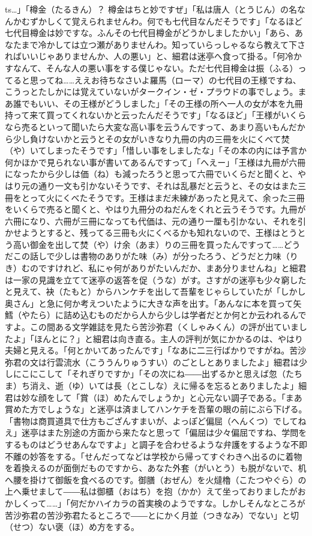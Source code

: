 \documentclass{book}
\begin{document}
ts{}\ldots{}」「樽金（たるきん）？ 樽金はちと妙ですぜ」「私は唐人（とうじん）の名なんかむずかしくて覚えられませんわ。何でも七代目なんだそうです」「なるほど七代目樽金は妙ですな。ふんその七代目樽金がどうかしましたかい」「あら、あなたまで冷かしては立つ瀬がありませんわ。知っていらっしゃるなら教えて下さればいいじゃありませんか、人の悪い」と、細君は迷亭へ食って掛る。「何冷かすなんて、そんな人の悪い事をする僕じゃない。ただ七代目樽金は振（ふる）ってると思ってね\ldots{}\ldots{}ええお待ちなさいよ羅馬（ローマ）の七代目の王様ですね、こうっとたしかには覚えていないがタークイン・ゼ・プラウドの事でしょう。まあ誰でもいい、その王様がどうしました」「その王様の所へ一人の女が本を九冊持って来て買ってくれないかと云ったんだそうです」「なるほど」「王様がいくらなら売るといって聞いたら大変な高い事を云うんですって、あまり高いもんだから少し負けないかと云うとその女がいきなり九冊の内の三冊を火にくべて焚（や）いてしまったそうです」「惜しい事をしましたな」「その本の内には予言か何かほかで見られない事が書いてあるんですって」「へえー」「王様は九冊が六冊になったから少しは価（ね）も減ったろうと思って六冊でいくらだと聞くと、やはり元の通り一文も引かないそうです、それは乱暴だと云うと、その女はまた三冊をとって火にくべたそうです。王様はまだ未練があったと見えて、余った三冊をいくらで売ると聞くと、やはり九冊分のねだんをくれと云うそうです。九冊が六冊になり、六冊が三冊になっても代価は、元の通り一厘も引かない、それを引かせようとすると、残ってる三冊も火にくべるかも知れないので、王様はとうとう高い御金を出して焚（や）け余（あま）りの三冊を買ったんですって\ldots{}\ldots{}どうだこの話しで少しは書物のありがた味（み）が分ったろう、どうだと力味（りき）むのですけれど、私にゃ何がありがたいんだか、まあ分りませんね」と細君は一家の見識を立てて迷亭の返答を促（うな）がす。さすがの迷亭も少々窮したと見えて、袂（たもと）からハンケチを出して吾輩をじゃらしていたが「しかし奥さん」と急に何か考えついたように大きな声を出す。「あんなに本を買って矢鱈（やたら）に詰め込むものだから人から少しは学者だとか何とか云われるんですよ。この間ある文学雑誌を見たら苦沙弥君（くしゃみくん）の評が出ていましたよ」「ほんとに？」と細君は向き直る。主人の評判が気にかかるのは、やはり夫婦と見える。「何とかいてあったんです」「なあに二三行ばかりですがね。苦沙弥君の文は行雲流水（こううんりゅうすい）のごとしとありましたよ」細君は少しにこにこして「それぎりですか」「その次にね――出ずるかと思えば忽（たちま）ち消え、逝（ゆ）いては長（とこしな）えに帰るを忘るとありましたよ」細君は妙な顔をして「賞（ほ）めたんでしょうか」と心元ない調子である。「まあ賞めた方でしょうな」と迷亭は済ましてハンケチを吾輩の眼の前にぶら下げる。「書物は商買道具で仕方もござんすまいが、よっぽど偏屈（へんくつ）でしてねえ」迷亭はまた別途の方面から来たなと思って「偏屈は少々偏屈ですね、学問をするものはどうせあんなですよ」と調子を合わせるような弁護をするような不即不離の妙答をする。「せんだってなどは学校から帰ってすぐわきへ出るのに着物を着換えるのが面倒だものですから、あなた外套（がいとう）も脱がないで、机へ腰を掛けて御飯を食べるのです。御膳（おぜん）を火燵櫓（こたつやぐら）の上へ乗せまして――私は御櫃（おはち）を抱（かか）えて坐っておりましたがおかしくって\ldots{}\ldots{}」「何だかハイカラの首実検のようですな。しかしそんなところが苦沙弥君の苦沙弥君たるところで――とにかく月並（つきなみ）でない」と切（せつ）ない褒（ほ）め方をする。
\end{document}
